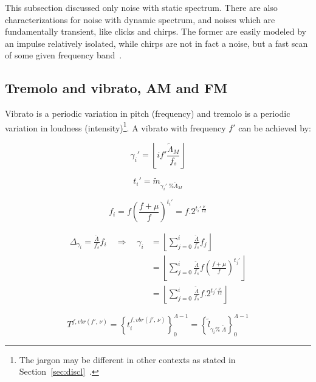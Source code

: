 This subsection discussed only noise with static spectrum. There are also characterizations for noise with dynamic spectrum, and noises which are fundamentally transient, like clicks and chirps. The former are easily modeled by an impulse relatively isolated, while chirps are not in fact a noise, but a fast scan of some given frequency band~\cite{Cook}.

\subsection{Tremolo and vibrato, AM and FM}\label{subsec:tvaf}
Vibrato is a periodic variation in pitch (frequency) and tremolo is a periodic variation in loudness (intensity)\footnote{The
jargon may be different in other contexts as stated in Section~\ref{sec:discl}~\cite{Lacerda,Harmonia}.}.
A vibrato with frequency $f'$ can be achieved by:

\begin{equation}\label{vbrGamma}
 \gamma_i'=\left \lfloor i f' \frac{\widetilde{\Lambda}_M}{f_s} \right \rfloor
\end{equation}

\begin{equation}\label{vbrAux}
 t_i'=\widetilde{m}_{\gamma_i' \;\% \widetilde{\Lambda}_M}
\end{equation}

\begin{equation}\label{vbrF}
 f_i=f \left ( \frac{f + \mu }{f} \right )^{t_i'}=f . 2^{t_i'\frac{\nu}{12}}
\end{equation}

\begin{equation}\label{vbrGamma2}
\begin{split}
	\Delta_{\gamma_i}=\frac{\widetilde{\Lambda}}{f_s}f_i \quad \Rightarrow \quad \gamma_i & = \left \lfloor \sum_{j=0}^{i} \frac{\widetilde{\Lambda}}{f_s}f_j \right \rfloor \\ 
	& = \left \lfloor \sum_{j=0}^{i} \frac{\widetilde{\Lambda}}{f_s}f \left ( \frac{f + \mu }{f} \right )^{t_j'}  \right \rfloor \\
	& = \left \lfloor \sum_{j=0}^{i} \frac{\widetilde{\Lambda}}{f_s}f . 2^{t_j'\frac{\nu}{12}}  \right \rfloor
\end{split}
\end{equation}

\begin{equation}\label{vbrT}
 T^{f, vbr(f',\,\nu)}=\left\{ t_i^{f,vbr(f',\,\nu)} \right\}_0^{\Lambda-1}=\left\{ \widetilde{l}_{\gamma_i \%\; \widetilde{\Lambda} } \right\}_0^{\Lambda-1}
\end{equation}

